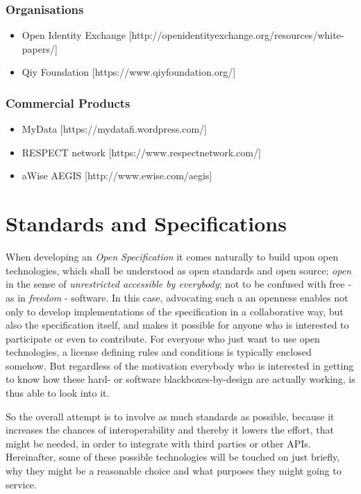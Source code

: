 \documentclass[12pt,english,a4paper,titlepage,cleardoublepage=empty,dottedtoc]{report}
\providecommand{\tightlist}{%
  \setlength{\itemsep}{0pt}\setlength{\parskip}{0pt}}
\begin{document}
\subsubsection{Organisations}\label{organisations}

\begin{itemize}
\tightlist
\item
  Open Identity Exchange
  {[}http://openidentityexchange.org/resources/white-papers/{]}
\item
  Qiy Foundation {[}https://www.qiyfoundation.org/{]}
\end{itemize}

\subsubsection{Commercial Products}\label{commercial-products}

\begin{itemize}
\tightlist
\item
  MyData {[}https://mydatafi.wordpress.com/{]}
\item
  RESPECT network {[}https://www.respectnetwork.com/{]}
\item
  aWise AEGIS {[}http://www.ewise.com/aegis{]}
\end{itemize}

\section{Standards and
Specifications}\label{standards-and-specifications}

When developing an \emph{Open Specification} it comes naturally to build
upon open technologies, which shall be understood as open standards and
open source; \emph{open} in the sense of \emph{unrestricted accessible
by everybody}; not to be confused with free - as in \emph{freedom} -
software. In this case, advocating such a an openness enables not only
to develop implementations of the specification in a collaborative way,
but also the specification itself, and makes it possible for anyone who
is interested to participate or even to contribute. For everyone who
just want to use open technologies, a license defining rules and
conditions is typically enclosed somehow. But regardless of the
motivation everybody who is interested in getting to know how these
hard- or software blackboxes-by-design are actually working, is thus
able to look into it.

So the overall attempt is to involve as much standards as possible,
because it increases the chances of interoperability and thereby it
lowers the effort, that might be needed, in order to integrate with
third parties or other APIs. Hereinafter, some of these possible
technologies will be touched on just briefly, why they might be a
reasonable choice and what purposes they might going to service.
\end{document}
